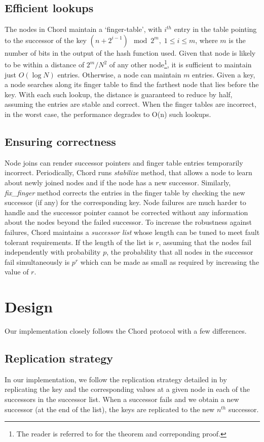 \documentclass{sig-alternate-10pt}
\begin{document}
\subsection{Efficient lookups}
The nodes in Chord maintain a `finger-table', with $i^{th}$ entry in the table pointing to the successor of the key $(n + 2^{i - 1}) \mod 2^m, \; 1 \leq i \leq m$, where $m$ is the number of bits in the output of the hash function used. Given that node is likely to be within a distance of $2^m/N^2$ of any other node\footnote{The reader is referred to \cite{chord} for the theorem and correponding proof.}, it is sufficient to maintain just $O (\log N)$ entries. Otherwise, a node can maintain $m$ entries. Given a key, a node searches along its finger table to find the farthest node that lies before the key. With each such lookup, the distance is guaranteed to reduce by half, assuming the entries are stable and correct. When the finger tables are incorrect, in the worst case, the performance degrades to O(n) such lookups.
\subsection{Ensuring correctness}
Node joins can render successor pointers and finger table entries temporarily incorrect. Periodically, Chord runs \textit{stabilize} method, that allows a node to learn about newly joined nodes and if the node has a new successor. Similarly, \textit{fix\_finger} method corrects the entries in the finger table by checking the new successor (if any) for the corresponding key. Node failures are much harder to handle and the successor pointer cannot be corrected without any information about the nodes beyond the failed successor. To increase the robustness against failures, Chord maintains a \textit{successor list} whose length can be tuned to meet fault tolerant requirements. If the length of the list is $r$, assuming that the nodes fail independently with probability $p$, the probability that all nodes in the successor fail simultaneously is $p^r$ which can be made as small as required by increasing the value of $r$.

\section{Design}
Our implementation closely follows the Chord protocol with a few differences. 

\subsection{Replication strategy}
In our implementation, we follow the replication strategy detailed in \cite{dynamo} by replicating the key and the corresponding values at a given node in each of the successors in the successor list. When a successor fails and we obtain a new successor (at the end of the list), the keys are replicated to the new $n^{th}$ successor.
\end{document}
